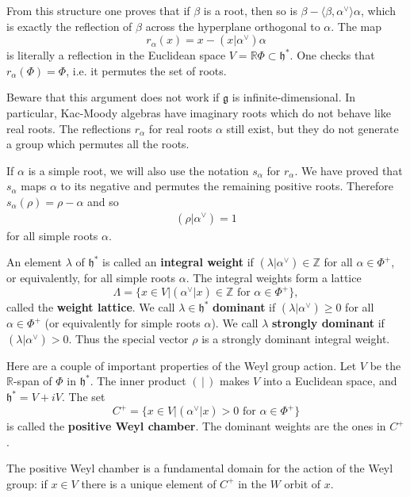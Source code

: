 \documentclass[12pt]{article}
\begin{document}
\begin{remark}
    From this structure one proves that if $\beta$ is a root, then so is $\beta - \langle \beta,\alpha^\vee \rangle \alpha$, which is exactly the reflection of $\beta$ across the hyperplane orthogonal to $\alpha$. The map
    \[
        r_\alpha(x) = x - (x|\alpha^\vee)\alpha
    \]
    is literally a reflection in the Euclidean space $V = \mathbb{R}\Phi \subset \mathfrak{h}^*$.
    One checks that $r_\alpha(\Phi) = \Phi$, i.e. it permutes the set of roots.

    Beware that this argument does not work if $\mathfrak{g}$ is infinite-dimensional. In particular, Kac-Moody algebras have imaginary roots which do not behave like real roots. The reflections $r_\alpha$ for real roots $\alpha$ still exist, but they do not generate a group which permutes all the roots.
\end{remark}

If $\alpha$ is a simple root, we will also use the notation $s_\alpha$ for $r_\alpha$. We have proved that $s_\alpha$ maps $\alpha$ to its negative and permutes the remaining positive roots. Therefore $s_\alpha(\rho) = \rho - \alpha$ and so
\begin{align*}
    (\rho|\alpha^\vee) = 1
\end{align*}
for all simple roots $\alpha$.

An element $\lambda$ of $\mathfrak{h}^*$ is called an \textbf{integral weight} if $(\lambda|\alpha^\vee) \in \mathbb{Z}$ for all $\alpha \in \Phi^+$, or equivalently, for all simple roots $\alpha$. The integral weights form a lattice
\[
    \Lambda = \{x \in V | (\alpha^\vee|x) \in \mathbb{Z} \text{ for } \alpha \in \Phi^+ \},
\]
called the \textbf{weight lattice}. We call $\lambda \in \mathfrak{h}^*$ \textbf{dominant} if $(\lambda|\alpha^\vee) \geq 0$ for all $\alpha \in \Phi^+$ (or equivalently for simple roots $\alpha$). We call $\lambda$ \textbf{strongly dominant} if $(\lambda|\alpha^\vee) > 0$. Thus the special vector $\rho$ is a strongly dominant integral weight.

Here are a couple of important properties of the Weyl group action. Let $V$ be the $\mathbb{R}$-span of $\Phi$ in $\mathfrak{h}^*$. The inner product $(\,|\,)$ makes $V$ into a Euclidean space, and $\mathfrak{h}^* = V + iV$. The set
\[
    C^+ = \{ x \in V | (\alpha^\vee|x) > 0 \text{ for } \alpha \in \Phi^+ \}
\]
is called the \textbf{positive Weyl chamber}. The dominant weights are the ones in $C^+$.

\begin{proposition}\label{prop:fundamental_domain}
    The positive Weyl chamber is a fundamental domain for the action of the Weyl group:
    if $x \in V$ there is a unique element of $C^+$ in the $W$ orbit of $x$.
\end{proposition}
\end{document}
